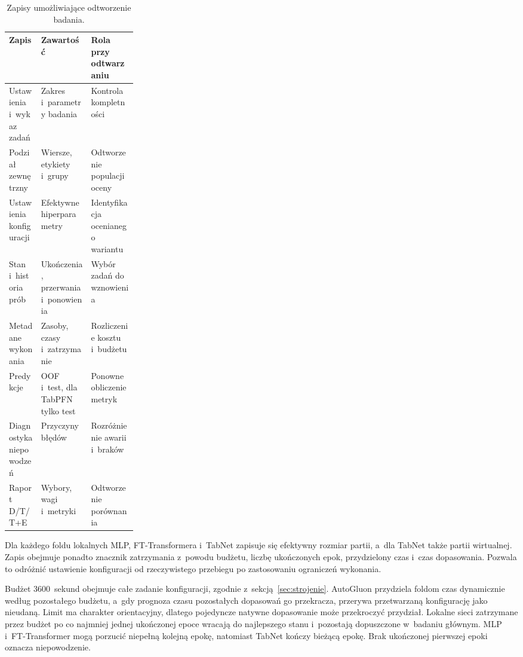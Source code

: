 \begin{table}[!htbp]
\centering\small
\caption{Zapisy umożliwiające odtworzenie badania.}
\label{tab:artefakty}
\begin{tabularx}{\linewidth}{@{}P{0.25\linewidth}YY@{}}
\toprule
Zapis & Zawartość & Rola przy odtwarzaniu \\
\midrule
Ustawienia i~wykaz zadań & Zakres i~parametry badania & Kontrola kompletności \\
Podział zewnętrzny & Wiersze, etykiety i~grupy & Odtworzenie populacji oceny \\
Ustawienia konfiguracji & Efektywne hiperparametry & Identyfikacja ocenianego wariantu \\
Stan i~historia prób & Ukończenia, przerwania i~ponowienia & Wybór zadań do wznowienia \\
Metadane wykonania & Zasoby, czasy i~zatrzymanie & Rozliczenie kosztu i~budżetu \\
Predykcje & OOF i~test, dla TabPFN tylko test & Ponowne obliczenie metryk \\
Diagnostyka niepowodzeń & Przyczyny błędów & Rozróżnienie awarii i~braków \\
Raport D/T/T+E & Wybory, wagi i~metryki & Odtworzenie porównania \\
\bottomrule
\end{tabularx}
\end{table}

Dla każdego foldu lokalnych MLP, FT-Transformera i~TabNet zapisuje się efektywny rozmiar partii, a~dla TabNet także partii wirtualnej. Zapis obejmuje ponadto znacznik zatrzymania z~powodu budżetu, liczbę ukończonych epok, przydzielony czas i~czas dopasowania. Pozwala to odróżnić ustawienie konfiguracji od rzeczywistego przebiegu po zastosowaniu ograniczeń wykonania.

Budżet 3600~sekund obejmuje całe zadanie konfiguracji, zgodnie z~sekcją~\ref{sec:strojenie}. AutoGluon przydziela foldom czas dynamicznie według pozostałego budżetu, a~gdy prognoza czasu pozostałych dopasowań go przekracza, przerywa przetwarzaną konfigurację jako nieudaną. Limit ma charakter orientacyjny, dlatego pojedyncze natywne dopasowanie może przekroczyć przydział. Lokalne sieci zatrzymane przez budżet po co najmniej jednej ukończonej epoce wracają do najlepszego stanu i~pozostają dopuszczone w~badaniu głównym. MLP i~FT-Transformer mogą porzucić niepełną kolejną epokę, natomiast TabNet kończy bieżącą epokę. Brak ukończonej pierwszej epoki oznacza niepowodzenie.

